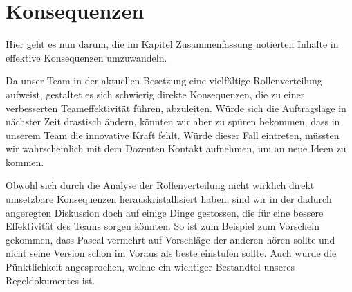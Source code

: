 
\chapter{Konsequenzen}

Hier geht es nun darum, die im Kapitel Zusammenfassung notierten Inhalte in effektive Konsequenzen umzuwandeln.

Da unser Team in der aktuellen Besetzung eine vielfältige Rollenverteilung aufweist, gestaltet es sich schwierig direkte Konsequenzen, die zu einer verbesserten Teameffektivität führen, abzuleiten. Würde sich die Auftragslage in nächster Zeit drastisch ändern, könnten wir aber zu spüren bekommen, dass in unserem Team die innovative Kraft fehlt. Würde dieser Fall eintreten, müssten wir wahrscheinlich mit dem Dozenten Kontakt aufnehmen, um an neue Ideen zu kommen. 

Obwohl sich durch die Analyse der Rollenverteilung nicht wirklich direkt umsetzbare Konsequenzen herauskristallisiert haben, sind wir in der dadurch angeregten Diskussion doch auf einige Dinge gestossen, die für eine bessere Effektivität des Teams sorgen könnten.
So ist zum Beispiel zum Vorschein gekommen, dass Pascal vermehrt auf Vorschläge der anderen hören sollte und nicht seine Version schon im Voraus als beste einstufen sollte. Auch wurde die Pünktlichkeit angesprochen, welche ein wichtiger Bestandtel unseres Regeldokumentes ist. 